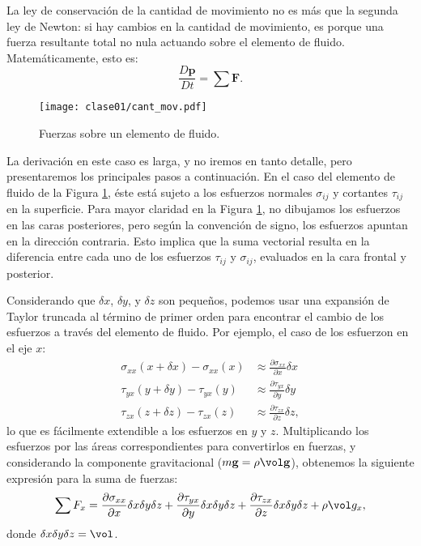 La ley de conservación de la cantidad de movimiento no es más que la segunda ley de Newton: si hay cambios en la cantidad de movimiento, es porque una fuerza resultante total no nula actuando sobre el elemento de fluido.
Matemáticamente, esto es:
%
\begin{equation}\label{eq:cant_mov}
\frac{D\mathbf{p}}{Dt} = \sum\mathbf{F}.
\end{equation}

\begin{figure}[h!]
\centering
\texttt{[image: clase01/cant\_mov.pdf]}
\caption{Fuerzas sobre un elemento de fluido.}
\label{fig:cant_mov}
\end{figure}

La derivación en este caso es larga, y no iremos en tanto detalle, pero presentaremos los principales pasos a continuación.
En el caso del elemento de fluido de la Figura \ref{fig:cant_mov}, éste está sujeto a los esfuerzos normales $\sigma_{ij}$ y cortantes $\tau_{ij}$ en la superficie.
Para mayor claridad en la Figura \ref{fig:cant_mov}, no dibujamos los esfuerzos en las caras posteriores, pero según la convención de signo, los esfuerzos apuntan en la dirección contraria.
Esto implica que la suma vectorial resulta en la diferencia entre cada uno de los esfuerzos $\tau_{ij}$ y $\sigma_{ij}$, evaluados en la cara frontal y posterior.

Considerando que $\delta x$, $\delta y$, y $\delta z$ son pequeños, podemos usar una expansión de Taylor truncada al término de primer orden para encontrar el cambio de los esfuerzos a través del elemento de fluido.
Por ejemplo, el caso de los esfuerzon en el eje $x$:
%
\begin{align}
\sigma_{xx}(x+\delta x)-\sigma_{xx}(x) &\approx \frac{\partial \sigma_{xx}}{\partial x}\delta x \nonumber \\
\tau_{yx}(y+\delta y)-\tau_{yx}(y) &\approx \frac{\partial \tau_{yx}}{\partial y}\delta y \nonumber \\
\tau_{zx}(z+\delta z)-\tau_{zx}(z) &\approx \frac{\partial \tau_{zx}}{\partial z}\delta z,
\end{align}
%
lo que es fácilmente extendible a los esfuerzos en $y$ y $z$. 
Multiplicando los esfuerzos por las áreas correspondientes para convertirlos en fuerzas, y considerando la componente gravitacional ($m\mathbf{g}=\rho\vol\mathbf{g}$), obtenemos la siguiente expresión para la suma de fuerzas:
%
\begin{equation}\label{eq:suma_F}
\sum F_x = \frac{\partial \sigma_{xx}}{\partial x}\delta x\delta y \delta z + \frac{\partial \tau_{yx}}{\partial y} \delta x \delta y \delta z + \frac{\partial \tau_{zx}}{\partial z} \delta x \delta y \delta z + \rho \vol g_x,
\end{equation}
%
donde $\delta x \delta y \delta z=\vol$.

